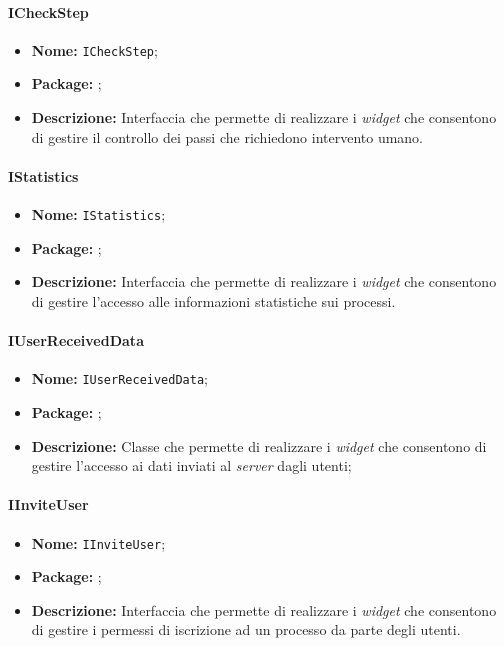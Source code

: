 \paragraph{ICheckStep}
\begin{itemize}
\item \textbf{Nome:} \texttt{ICheckStep};
\item \textbf{Package:} \texttt{\iViewAdmin{}};
\item \textbf{Descrizione:} Interfaccia che permette di realizzare i \textit{widget} che consentono di gestire il controllo dei passi che richiedono intervento umano.
\end{itemize}

\paragraph{IStatistics}
\begin{itemize}
\item \textbf{Nome:} \texttt{IStatistics};
\item \textbf{Package:} \texttt{\iViewAdmin{}};
\item \textbf{Descrizione:} Interfaccia che permette di realizzare i \textit{widget} che consentono di gestire l'accesso alle informazioni statistiche sui processi.
\end{itemize}

\paragraph{IUserReceivedData}
\begin{itemize}
\item \textbf{Nome:} \texttt{IUserReceivedData};
\item \textbf{Package:} \texttt{\iViewAdmin{}};
\item \textbf{Descrizione:} Classe che permette di realizzare i \textit{widget} che consentono di gestire l'accesso ai dati inviati al \textit{server} dagli utenti;
\end{itemize}

\paragraph{IInviteUser}
\begin{itemize}
\item \textbf{Nome:} \texttt{IInviteUser};
\item \textbf{Package:} \texttt{\iViewAdmin{}};
\item \textbf{Descrizione:} Interfaccia che permette di realizzare i \textit{widget} che consentono di gestire i permessi di iscrizione ad un processo da parte degli utenti.
\end{itemize}